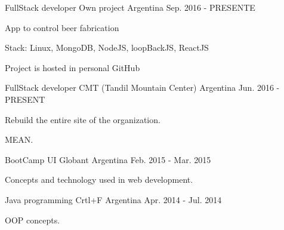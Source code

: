 


\begin{cventries}


\cventry
{FullStack developer} %
{Own project} %
{Argentina} %
{Sep. 2016 - PRESENTE} %
{ %
\begin{cvitems}
\item {App to control beer fabrication}
\item {Stack: Linux, MongoDB, NodeJS, loopBackJS, ReactJS}
\item {Project is hosted in personal GitHub}
\end{cvitems}
}
\cventry
{FullStack developer} %
{CMT (Tandil Mountain Center)} %
{Argentina} %
{Jun. 2016 - PRESENT} %
{ %
\begin{cvitems}
\item {Rebuild the entire site of the organization.}
\item {MEAN.}
\end{cvitems}
}


\cventry
{BootCamp UI} %
{Globant} %
{Argentina} %
{Feb. 2015 - Mar. 2015} %
{ %
\begin{cvitems}
\item {Concepts and technology used in web development.}
\end{cvitems}
}


\cventry
{Java programming} %
{Crtl+F} %
{Argentina} %
{Apr. 2014 - Jul. 2014} %
{ %
\begin{cvitems}
\item {OOP concepts.}
\end{cvitems}
}


\end{cventries}
